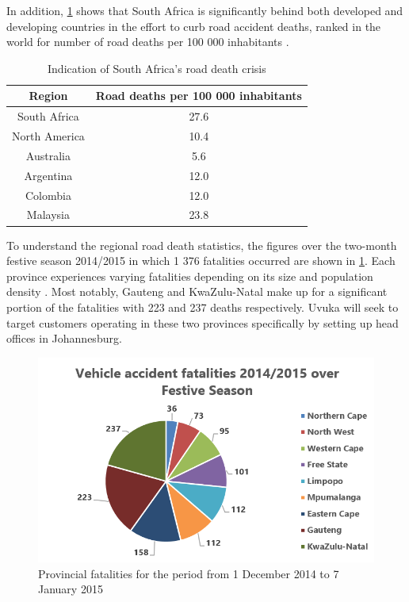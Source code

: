 In addition, \cref{tab:deaths100thousand} shows that South Africa is significantly behind both developed and developing countries in the effort to curb road accident deaths, ranked  in the world for number of road deaths per 100 000 inhabitants \cite{deathsPer100thousandStats}.

\begin{table}[htbp]
  \centering
  \caption{Indication of South Africa's road death crisis}
    \begin{tabular}{cc}
    \toprule
    \textbf{Region} & \textbf{Road deaths per 100 000 inhabitants} \\
    \midrule
    South Africa & 27.6 \\
    North America & 10.4 \\
    Australia & 5.6 \\
    Argentina & 12.0 \\
    Colombia & 12.0 \\
    Malaysia & 23.8 \\
    \bottomrule
    \end{tabular}%
  \label{tab:deaths100thousand}%
\end{table}%

To understand the regional road death statistics, the figures over the two-month festive season 2014/2015 in which 1 376 fatalities occurred are shown in \cref{fig:festiveSeason}. Each province experiences varying fatalities depending on its size and population density \cite{ProvincialFestiveStats}. Most notably, Gauteng and KwaZulu-Natal make up for a significant portion of the fatalities with 223 and 237 deaths respectively. Uvuka will seek to target customers operating in these two provinces specifically by setting up head offices in Johannesburg.

\begin{figure}[H]
\centering
\includegraphics[width=1\textwidth]{images/provincial_fatalities.PNG}
\vskip10pt
\caption[Provincial fatalities for the period from 1 December 2014 to 7 January 2015]{Provincial fatalities for the period from 1 December 2014 to 7 January 2015}
\label{fig:festiveSeason}
\end{figure}


